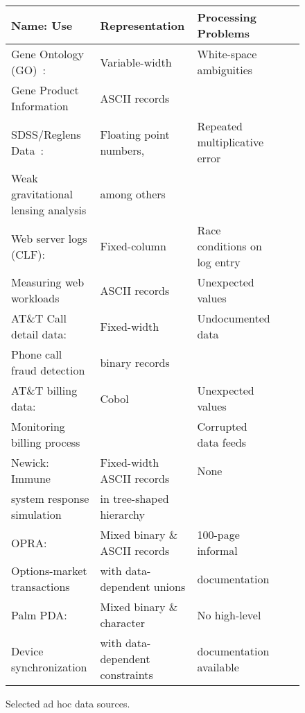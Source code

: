 \documentclass[11pt]{article}
\begin{document}
\begin{figure*}
\begin{center}
\begin{tabular}{@{}|l|l|l|l|l|}
\hline
Name: Use                           & Representation    & Processing Problems \\ \hline\hline
Gene Ontology (GO)~\cite{geneontology}:                  & Variable-width    & White-space ambiguities \\
Gene Product Information 	      & ASCII records &  \\ \hline
SDSS/Reglens Data~\cite{mandelbaum+:reglens}:                & Floating point numbers, & Repeated multiplicative error \\
Weak gravitational lensing analysis   & among others & \\ \hline
Web server logs (CLF):                & Fixed-column      & Race conditions on log entry\\ 
Measuring web workloads               & ASCII records     & Unexpected values\\ \hline
AT\&T Call detail data:                          & Fixed-width       & Undocumented data\\
Phone call fraud detection            & binary records  & \\ \hline 
AT\&T billing data:                 & Cobol             &  Unexpected values\\ 
Monitoring billing process          &                   & Corrupted data feeds \\ \hline
Newick:   Immune                    & Fixed-width ASCII records & None \\ 
system response simulation          & in tree-shaped hierarchy &\\ \hline                                
OPRA:                               & Mixed binary \& ASCII records 
                                                       & 100-page informal \\
Options-market transactions         & with data-dependent unions & documentation \\ \hline
Palm PDA:                           & Mixed binary \& character & No high-level  \\
Device synchronization              & with data-dependent constraints & documentation available\\ \hline
\end{tabular}
\caption{Selected ad hoc data sources.}
\label{figure:data-sources}
\end{center}
\end{figure*}
\end{document}
